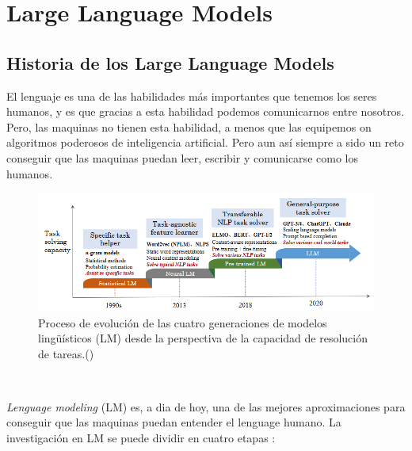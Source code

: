 \chapter{Large Language Models}
\label{cap:large_language_models}


\section{Historia de los Large Language Models}
\label{sec:historia}

El lenguaje es una de las habilidades más importantes que tenemos los seres humanos, y es
que gracias a esta habilidad podemos comunicarnos entre nosotros. Pero, las maquinas no
tienen esta habilidad, a menos que las equipemos on algoritmos poderosos de inteligencia
artificial. Pero aun así siempre a sido un reto conseguir que las maquinas puedan leer, 
escribir y comunicarse como los humanos.

\begin{figure}[H]
    \begin{center}
      \includegraphics[width=15cm]{figuras/Capitulo_09/EvolutionLM.png}
    \end{center}
    \caption[Proceso de evolución de las cuatro generaciones de modelos lingüísticos (LM) desde la perspectiva de la capacidad de resolución de tareas.]{Proceso de evolución de las cuatro generaciones de modelos lingüísticos (LM) desde la perspectiva de la capacidad de resolución de tareas.(\cite{ZhaoWayneXin2023ASoL})}
    \label{fig:evolutionLM}
\end{figure}\

\textit{Lenguage modeling} (LM) es, a dia de hoy, una de las mejores aproximaciones para conseguir
que las maquinas puedan entender el lenguage humano. La investigación en LM se puede dividir
en cuatro etapas \cite{ZhaoWayneXin2023ASoL}:


